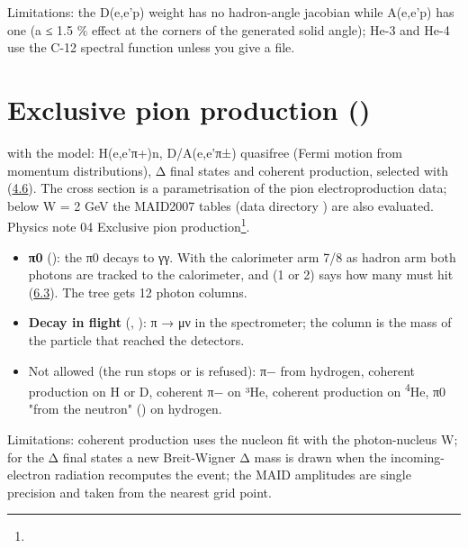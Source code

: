 Limitations: the D(e,e'p) weight has no hadron-angle jacobian while A(e,e'p) has one (a ≤ 1.5 \% effect at the corners of
the generated solid angle); He-3 and He-4 use the C-12 spectral function unless you give a file.

\section{\texorpdfstring{Exclusive pion production ()}{Exclusive pion production (doing\_\allowbreak{}pion)}}\label{user_manual-05u5freactions:53-exclusive-pion-production-doingu5fpion}
 with the  model: H(e,e'π+)n, D/A(e,e'π±) quasifree (Fermi motion from momentum distributions),\allowbreak{} Δ
final states and coherent production, selected with \hyperref[param:whichu5fpion]{} (\hyperref[user_manual-04u5finputs:46-parameter-reference]{4.6}). The cross
section is a parametrisation of the pion electroproduction data; below W = 2 GeV the MAID2007 tables (data directory
) are also evaluated.
Physics note 04 Exclusive pion production\footnote{}.


\begin{itemize}
\item \textbf{π0} (): the π0 decays to γγ. With the calorimeter arm 7/8 as hadron arm both photons are tracked
to the calorimeter,\allowbreak{} and \hyperref[param:pizerou5fngamma]{} (1 or 2) says how many must hit (\hyperref[user_manual-06u5fspectrometers:63-the-calorimeter-arms-7-and-8]{6.3}).
The tree gets 12 photon columns.
\item \textbf{Decay in flight} (, \hyperref[param:ctau]{}): π → μν in the spectrometer; the  column is the mass of the
particle that reached the detectors.
\item Not allowed (the run stops or is refused): π− from hydrogen, coherent production on H or D, coherent π− on ³He,
coherent production on \textsuperscript{4}He,\allowbreak{} π0 "from the neutron" () on hydrogen.
\end{itemize}
Limitations: coherent production uses the nucleon fit with the photon-nucleus W; for the Δ final states a new
Breit-Wigner Δ mass is drawn when the incoming-electron radiation recomputes the event; the MAID amplitudes are single
precision and taken from the nearest grid point.

